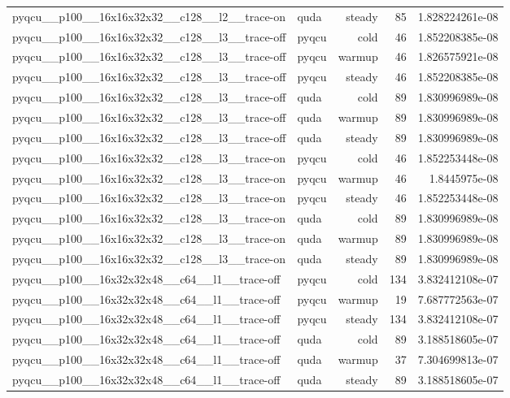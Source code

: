 \begin{table}[htbp]
\begin{tabular}{@{}llrrr@{}}
pyqcu\_\_p100\_\_16x16x32x32\_\_c128\_\_l2\_\_trace-on & quda & steady & 85 & 1.828224261e-08 \\
pyqcu\_\_p100\_\_16x16x32x32\_\_c128\_\_l3\_\_trace-off & pyqcu & cold & 46 & 1.852208385e-08 \\
pyqcu\_\_p100\_\_16x16x32x32\_\_c128\_\_l3\_\_trace-off & pyqcu & warmup & 46 & 1.826575921e-08 \\
pyqcu\_\_p100\_\_16x16x32x32\_\_c128\_\_l3\_\_trace-off & pyqcu & steady & 46 & 1.852208385e-08 \\
pyqcu\_\_p100\_\_16x16x32x32\_\_c128\_\_l3\_\_trace-off & quda & cold & 89 & 1.830996989e-08 \\
pyqcu\_\_p100\_\_16x16x32x32\_\_c128\_\_l3\_\_trace-off & quda & warmup & 89 & 1.830996989e-08 \\
pyqcu\_\_p100\_\_16x16x32x32\_\_c128\_\_l3\_\_trace-off & quda & steady & 89 & 1.830996989e-08 \\
pyqcu\_\_p100\_\_16x16x32x32\_\_c128\_\_l3\_\_trace-on & pyqcu & cold & 46 & 1.852253448e-08 \\
pyqcu\_\_p100\_\_16x16x32x32\_\_c128\_\_l3\_\_trace-on & pyqcu & warmup & 46 & 1.8445975e-08 \\
pyqcu\_\_p100\_\_16x16x32x32\_\_c128\_\_l3\_\_trace-on & pyqcu & steady & 46 & 1.852253448e-08 \\
pyqcu\_\_p100\_\_16x16x32x32\_\_c128\_\_l3\_\_trace-on & quda & cold & 89 & 1.830996989e-08 \\
pyqcu\_\_p100\_\_16x16x32x32\_\_c128\_\_l3\_\_trace-on & quda & warmup & 89 & 1.830996989e-08 \\
pyqcu\_\_p100\_\_16x16x32x32\_\_c128\_\_l3\_\_trace-on & quda & steady & 89 & 1.830996989e-08 \\
pyqcu\_\_p100\_\_16x32x32x48\_\_c64\_\_l1\_\_trace-off & pyqcu & cold & 134 & 3.832412108e-07 \\
pyqcu\_\_p100\_\_16x32x32x48\_\_c64\_\_l1\_\_trace-off & pyqcu & warmup & 19 & 7.687772563e-07 \\
pyqcu\_\_p100\_\_16x32x32x48\_\_c64\_\_l1\_\_trace-off & pyqcu & steady & 134 & 3.832412108e-07 \\
pyqcu\_\_p100\_\_16x32x32x48\_\_c64\_\_l1\_\_trace-off & quda & cold & 89 & 3.188518605e-07 \\
pyqcu\_\_p100\_\_16x32x32x48\_\_c64\_\_l1\_\_trace-off & quda & warmup & 37 & 7.304699813e-07 \\
pyqcu\_\_p100\_\_16x32x32x48\_\_c64\_\_l1\_\_trace-off & quda & steady & 89 & 3.188518605e-07 \\

\end{tabular}
\end{table}
